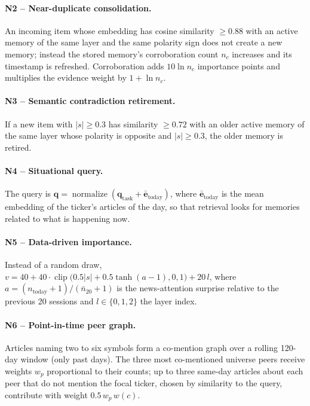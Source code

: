 \paragraph{N2 -- Near-duplicate consolidation.} An incoming item whose embedding has cosine similarity $\ge 0.88$ with an active memory of the same layer and the same polarity sign does not create a new memory; instead the stored memory's corroboration count $n_c$ increases and its timestamp is refreshed. Corroboration adds $10\ln n_c$ importance points and multiplies the evidence weight by $1+\ln n_c$.

\paragraph{N3 -- Semantic contradiction retirement.} If a new item with $|s|\ge 0.3$ has similarity $\ge 0.72$ with an older active memory of the same layer whose polarity is opposite and $|s|\ge 0.3$, the older memory is retired.

\paragraph{N4 -- Situational query.} The query is $\mathbf{q}=\operatorname{normalize}(\mathbf{q}_{\text{task}}+\bar{\mathbf{e}}_{\text{today}})$, where $\bar{\mathbf{e}}_{\text{today}}$ is the mean embedding of the ticker's articles of the day, so that retrieval looks for memories related to what is happening now.

\paragraph{N5 -- Data-driven importance.} Instead of a random draw, $v = 40 + 40\cdot\operatorname{clip}\!\big(0.5|s|+0.5\tanh(a-1),0,1\big) + 20\,l$, where $a=(n_{\text{today}}+1)/(\bar n_{20}+1)$ is the news-attention surprise relative to the previous 20 sessions and $l\in\{0,1,2\}$ the layer index.

\paragraph{N6 -- Point-in-time peer graph.} Articles naming two to six symbols form a co-mention graph over a rolling 120-day window (only past days). The three most co-mentioned universe peers receive weights $w_p$ proportional to their counts; up to three same-day articles about each peer that do not mention the focal ticker, chosen by similarity to the query, contribute with weight $0.5\,w_p\,w(c)$.

